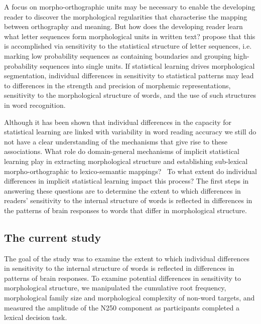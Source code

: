 \documentclass[review]{elsarticle}
\begin{document}
A focus on morpho-orthographic units may be necessary to enable the developing reader to discover the morphological regularities that characterise the mapping between orthography and meaning.  But how does the developing reader learn what letter sequences form morphological units in written text?  {\renewcommand\&{and}\citet{rastleMorphologicalDecompositionBased2008}} propose that this is accomplished via sensitivity to the statistical structure of letter sequences, i.e. marking low probability sequences as containing boundaries and  grouping high- probability sequences into single units. If statistical learning drives morphological segmentation, individual differences in sensitivity to statistical patterns may lead to differences in the strength and precision of morphemic representations,  sensitivity to the morphological structure of words,  and the use of such structures in word recognition. 

Although it has been shown that individual differences in the capacity for statistical learning are linked with variability in word reading accuracy \citep{arciuliReadingStatisticalLearning2018, arciuliStatisticalLearningRelated2012} we still do not have a clear understanding of the mechanisms that give rise to these associations. What role do domain-general mechanisms of implicit statistical learning play in extracting morphological structure and establishing sub-lexical morpho-orthographic to lexico-semantic mappings?  To what extent do individual differences in implicit statistical learning impact this process? The first steps in answering these questions are to determine the extent to which differences in readers’ sensitivity to the internal structure of words is reflected in differences in the patterns of brain responses to words that differ in morphological structure. 

\subsection{The current study}

The goal of the study was to examine the extent to which  individual differences in sensitivity to the internal structure of words is reflected in differences in  patterns of brain responses. To examine potential differences in sensitivity to morphological structure, we manipulated the cumulative root frequency, morphological family size and morphological complexity of non-word targets, and measured the amplitude of the N250 component as participants completed a lexical decision task.  
\end{document}
